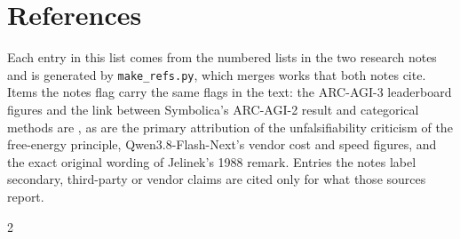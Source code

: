 \section*{References}
Each entry in this list comes from the numbered lists in the two research notes and is generated by \texttt{make\_refs.py}, which merges works that both notes cite. Items the notes flag carry the same flags in the text: the ARC-AGI-3 leaderboard figures and the link between Symbolica's ARC-AGI-2 result and categorical methods are \unverified{}, as are the primary attribution of the unfalsifiability criticism of the free-energy principle, Qwen3.8-Flash-Next's vendor cost and speed figures, and the exact original wording of Jelinek's 1988 remark. Entries the notes label secondary, third-party or vendor claims are cited only for what those sources report.

{\scriptsize
\renewcommand{\section}[2]{}%
\makeatletter\renewcommand{\@openbib@code}{\setlength{\itemsep}{0pt}\setlength{\parsep}{0pt}}\makeatother
{}\renewcommand{\UrlFont}{\scriptsize}\raggedright
\setlength{\columnsep}{1.2em}
\begin{multicols}{2}

\end{multicols}
}


